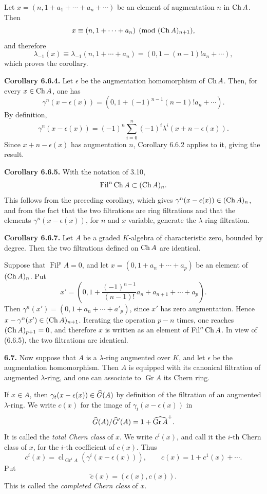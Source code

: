 \documentclass[11pt]{article}
\newcommand{\Gr}{\operatorname{Gr}}
\newcommand{\Fil}{\operatorname{Fil}}
\newcommand{\cl}{\operatorname{cl}}
\providecommand{\Gr}{\operatorname{Gr}}
\providecommand{\Gr}{\operatorname{G}}
\begin{document}
Let \(x=(n,1+a_1+\cdots+a_n+\cdots)\) be an element of augmentation \(n\) in \(\operatorname{Ch} A\). Then
\[
  x\equiv (n,1+\cdots+a_n)\pmod{(\operatorname{Ch} A)_{n+1}},
\]
and therefore
\[
  \lambda_{-1}(x)\equiv \lambda_{-1}(n,1+\cdots+a_n)
  =(0,1-(n-1)!a_n+\cdots),
\]
which proves the corollary.

\textbf{Corollary 6.6.4.} Let \(\epsilon\) be the augmentation homomorphism of \(\operatorname{Ch} A\). Then, for every \(x\in\operatorname{Ch} A\), one has
\[
  \gamma^n(x-\epsilon(x))
  =
  (0,1+(-1)^{n-1}(n-1)!a_n+\cdots).
\]
By definition,
\[
  \gamma^n(x-\epsilon(x))
  =
  (-1)^n\sum_{i=0}^n(-1)^i\lambda^i(x+n-\epsilon(x)).
\]
Since \(x+n-\epsilon(x)\) has augmentation \(n\), Corollary 6.6.2 applies to it, giving the result.

\textbf{Corollary 6.6.5.} With the notation of 3.10,
\[
  \Fil^n\Ch A\subset(\Ch A)_n.
\]
This follows from the preceding corollary, which gives \(\gamma^n(x-\epsilon(x))\in(\operatorname{Ch} A)_n\), and from the fact that the two filtrations are ring filtrations and that the elements \(\gamma^n(x-\epsilon(x))\), for \(n\) and \(x\) variable, generate the \(\lambda\)-ring filtration.

\textbf{Corollary 6.6.7.} Let \(A\) be a graded \(K\)-algebra of characteristic zero, bounded by degree. Then the two filtrations defined on \(\operatorname{Ch} A\) are identical.

Suppose that \(\Fil^p A=0\), and let \(x=(0,1+a_n+\cdots+a_p)\) be an element of \((\operatorname{Ch} A)_n\). Put
\[
  x'=\left(0,1+\frac{(-1)^{n-1}}{(n-1)!}a_n+a_{n+1}+\cdots+a_p\right).
\]
Then \(\gamma^n(x')=(0,1+a_n+\cdots+a'_p)\), since \(x'\) has zero augmentation. Hence \(x-\gamma^n(x')\in(\operatorname{Ch} A)_{n+1}\). Iterating the operation \(p-n\) times, one reaches \((\operatorname{Ch} A)_{p+1}=0\), and therefore \(x\) is written as an element of \(\Fil^n\Ch A\). In view of (6.6.5), the two filtrations are identical.

\textbf{6.7.} Now suppose that \(A\) is a \(\lambda\)-ring augmented over \(K\), and let \(\epsilon\) be the augmentation homomorphism. Then \(A\) is equipped with its canonical filtration of augmented \(\lambda\)-ring, and one can associate to \(\Gr A\) its Chern ring.

If \(x\in A\), then \(\gamma_t(x-\epsilon(x))\in\widehat G(A)\) by definition of the filtration of an augmented \(\lambda\)-ring. We write \(c(x)\) for the image of \(\gamma_t(x-\epsilon(x))\) in
\[
  \Ghat(A)/\Ghat'(A)=1+\widehat{\Gr A}^{+}.
\]
It is called the \emph{total Chern class} of \(x\). We write \(c^i(x)\), and call it the \(i\)-th Chern class of \(x\), for the \(i\)-th coefficient of \(c(x)\). Thus
\begin{equation}\tag{6.7.1}
  c^i(x)=\cl_{\Gr^iA}\!\left(\gamma^i(x-\epsilon(x))\right),
  \qquad
  c(x)=1+c^1(x)+\cdots .
\end{equation}
Put
\begin{equation}\tag{6.7.2}
  \widetilde c(x)=(\epsilon(x),c(x)).
\end{equation}
This is called the \emph{completed Chern class} of \(x\).
\end{document}
